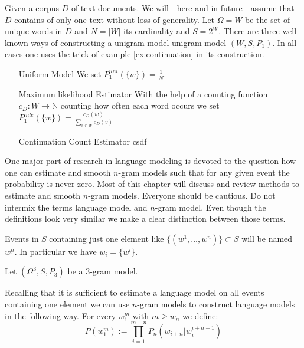 \documentclass[•]{book}
\begin{document}
\begin{example}
Given a corpus $D$ of text documents. We will - here and in future - assume that $D$ contains of only one text without loss of generality. Let $\Omega=W$ be the set of unique words in $D$ and $N = |W|$ its cardinality and $S=2^{W}$. There are three well known ways of constructing a unigram model unigram model $(W,S,P_1)$. In all cases one uses the trick of example \ref{ex:continuation} in its construction. 
\begin{itemize}
\item[Uniform Model] We set $P_1^{uni}(\{w\})=\frac{1}{N}$.
\item[Maximum likelihood Estimator]  With the help of a counting function $c_D:W\longrightarrow\mathbb{N}$ counting how often each word occurs we set $P_1^{mle}(\{w\})=\frac{c_D(w)}{\sum_{v\in W}c_D(v)}$
\item[Continuation Count Estimator] csdf
\end{itemize}
\end{example}

One major part of research in language modeling is devoted to the question how one can estimate and smooth $n$-gram models such that for any given event the probability is never zero. 
Most of this chapter will discuss and review methods to estimate and smooth $n$-gram models. 
Everyone should be cautious. 
Do not intermix the terms language model and $n$-gram model.
Even though the definitions look very similar we make a clear distinction between those terms. 

\begin{definition}
Events in  $S$ containing just one element like $\{(w^1,\dots,w^n)\}\subset S$ will be named $w_1^n$. 
In particular we have $w_i=\{w^i\}$.
\end{definition}
\begin{example}
Let $(\Omega^3,S,P_3)$ be a $3$-gram model. 
\end{example}

\begin{example}
Recalling that it is sufficient to estimate a language model on all events containing one element we can use $n$-gram models to construct language models in the following way. 
For every $w_1^m$ with $m\ge w_n$ we define:
\begin{equation}\label{eq:standardLanguageModel}
P(w_1^m):=\prod_{i=1}^{m-n}P_n(w_{i+n}|w_i^{i+n-1})
\end{equation}
\end{example}
\end{document}
